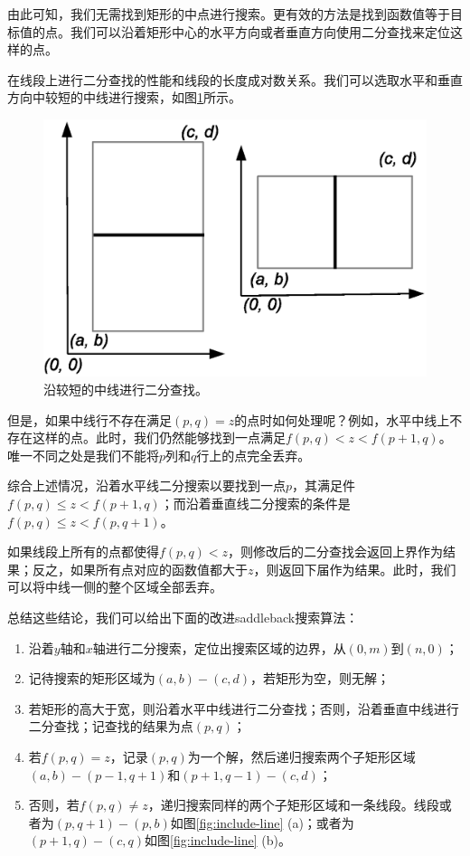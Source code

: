 \documentclass[UTF8]{article}
\begin{document}
由此可知，我们无需找到矩形的中点进行搜索。更有效的方法是找到函数值等于目标值的点。我们可以沿着矩形中心的水平方向或者垂直方向使用二分查找来定位这样的点。

在线段上进行二分查找的性能和线段的长度成对数关系。我们可以选取水平和垂直方向中较短的中线进行搜索，如图\ref{fig:saddleback-centerline}所示。

\begin{figure}[htbp]
 \centering
 \includegraphics[scale=0.5]{img/saddleback-centerline.eps}
 \caption{沿较短的中线进行二分查找。}
 \label{fig:saddleback-centerline}
\end{figure}

但是，如果中线行不存在满足$(p, q) = z$的点时如何处理呢？例如，水平中线上不存在这样的点。此时，我们仍然能够找到一点满足$f(p, q) < z < f(p+1, q)$。唯一不同之处是我们不能将$p$列和$q$行上的点完全丢弃。

综合上述情况，沿着水平线二分搜索以要找到一点$p$，其满足件$f(p, q) \leq z < f(p+1, q)$；而沿着垂直线二分搜索的条件是$f(p, q) \leq z < f(p, q + 1)$。

如果线段上所有的点都使得$f(p, q) < z$，则修改后的二分查找会返回上界作为结果；反之，如果所有点对应的函数值都大于$z$，则返回下届作为结果。此时，我们可以将中线一侧的整个区域全部丢弃。

总结这些结论，我们可以给出下面的改进saddleback搜索算法：

\begin{enumerate}
\item 沿着$y$轴和$x$轴进行二分搜索，定位出搜索区域的边界，从$(0, m)$到$(n, 0)$；
\item 记待搜索的矩形区域为$(a, b) - (c, d)$，若矩形为空，则无解；
\item 若矩形的高大于宽，则沿着水平中线进行二分查找；否则，沿着垂直中线进行二分查找；记查找的结果为点$(p, q)$；
\item 若$f(p, q) = z$，记录$(p, q)$为一个解，然后递归搜索两个子矩形区域$(a, b) - (p-1, q+1)$和$(p+1, q-1) - (c, d)$；
\item 否则，若$f(p, q) \neq z$，递归搜索同样的两个子矩形区域和一条线段。线段或者为$(p, q+1) - (p, b)$如图\ref{fig:include-line} (a)；或者为$(p+1, q) - (c, q)$如图\ref{fig:include-line} (b)。
\end{enumerate}
\end{document}
